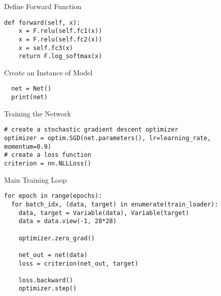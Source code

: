 \documentclass[14 pt]{beamer}
\begin{document}
\begin{frame}[fragile]{Define Forward Function}
  \begin{block}{}
\begin{verbatim}
def forward(self, x):
    x = F.relu(self.fc1(x))
    x = F.relu(self.fc2(x))
    x = self.fc3(x)
    return F.log_softmax(x)
\end{verbatim}
  \end{block}
\end{frame}

\begin{frame}[fragile]{Create an Instance of Model}
  \begin{block}{}
\begin{verbatim}
  net = Net()
  print(net)
\end{verbatim}
  \end{block}
\end{frame}

\begin{frame}[fragile]{Training the Network}
  \begin{block}{}
\begin{verbatim}
# create a stochastic gradient descent optimizer
optimizer = optim.SGD(net.parameters(), lr=learning_rate, momentum=0.9)
# create a loss function
criterion = nn.NLLLoss()
\end{verbatim}
  \end{block}
\end{frame}

\begin{frame}[fragile]{Main Training Loop}
\footnotesize{
  \begin{block}{}
\begin{verbatim}
for epoch in range(epochs):
  for batch_idx, (data, target) in enumerate(train_loader):
    data, target = Variable(data), Variable(target)
    data = data.view(-1, 28*28)

    optimizer.zero_grad()

    net_out = net(data)
    loss = criterion(net_out, target)

    loss.backward()
    optimizer.step()
\end{verbatim}
  \end{block}
}
\end{frame}
\end{document}
